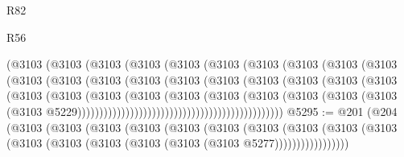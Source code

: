 \begin{lexlean}{R82}
\begin{lexlean}{R56}
\begin{coremodule}
{{{{{{{{{{{{{{{{{{{{{{{{{{{{{{{{{{{{{{{{{{{{{{{{{{{{{{{{{{{{{{{{{{{{{{{{{{{{{{{{{{{{{{{{{{{{{{{{{{{{{{{{{{{{{{{{{{{{{{{{{{{{{{{{{{{{{{{{{{{{{{{{{{{{{{{{{{{{{{{{{{{{{{{{{{{{{{{{{{{{{{{{{{{{{{{{{{{{{{{{{{{{{{{{{{{                                    (@3103
                                      (@3103
                                        (@3103
                                          (@3103
                                            (@3103
                                              (@3103
                                                (@3103
                                                  (@3103
                                                    (@3103
                                                      (@3103
                                                        (@3103
                                                          (@3103
                                                            (@3103
                                                              (@3103
                                                                (@3103
                                                                  (@3103
                                                                    (@3103
                                                                      (@3103
                                                                        (@3103
                                                                          (@3103
                                                                            (@3103
                                                                              (@3103
                                                                                (@3103
                                                                                  (@3103
                                                                                    (@3103
                                                                                      (@3103
                                                                                        (@3103
                                                                                          (@3103
                                                                                            (@3103
                                                                                              (@3103
                                                                                                (@3103
                                                                                                  @5229)))))))))))))))))))))))))))))))))))))))))))))))
@5295 := @201
    (@204
      (@3103
        (@3103
          (@3103
            (@3103
              (@3103
                (@3103
                  (@3103
                    (@3103
                      (@3103 (@3103 (@3103 (@3103 (@3103 (@3103 (@3103 (@3103 @5277)))))))))))))))))
}}}}}}}}}}}}}}}}}}}}}}}}}}}}}}}}}}}}}}}}}}}}}}}}}}}}}}}}}}}}}}}}}}}}}}}}}}}}}}}}}}}}}}}}}}}}}}}}}}}}}}}}}}}}}}}}}}}}}}}}}}}}}}}}}}}}}}}}}}}}}}}}}}}}}}}}}}}}}}}}}}}}}}}}}}}}}}}}}}}}}}}}}}}}}}}}}}}}}}}}}}}}}}}}}}}
\end{coremodule}
\end{lexlean}
\end{lexlean}
